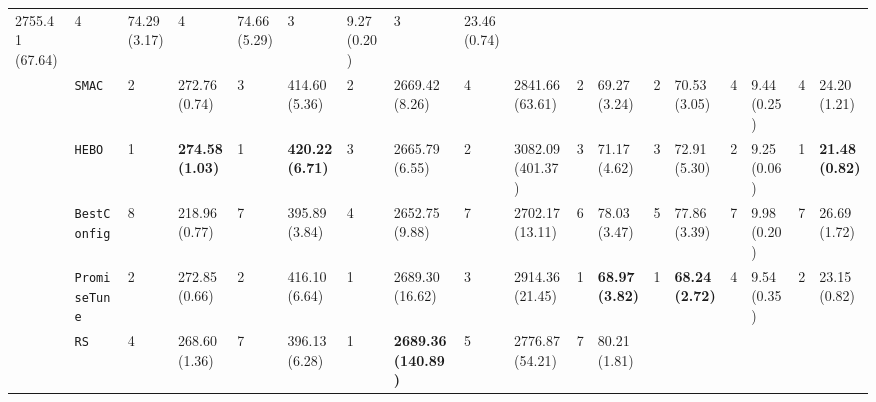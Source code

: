 \begin{tabular}{clllllllllllllllll}
  \multicolumn{1}{l|}{2755.41 (67.64)} &
  4 &
  \multicolumn{1}{l|}{74.29 (3.17)} &
  4 &
  \multicolumn{1}{l|}{74.66 (5.29)} &
  3 &
  \multicolumn{1}{l|}{9.27 (0.20)} &
  3 &
  23.46 (0.74) \\
\multicolumn{1}{c|}{} &
  \multicolumn{1}{l|}{\texttt{SMAC}} &
  2 &
  \multicolumn{1}{l|}{272.76 (0.74)} &
  3 &
  \multicolumn{1}{l|}{414.60 (5.36)} &
  2 &
  \multicolumn{1}{l|}{2669.42 (8.26)} &
  4 &
  \multicolumn{1}{l|}{2841.66 (63.61)} &
  2 &
  \multicolumn{1}{l|}{69.27 (3.24)} &
  2 &
  \multicolumn{1}{l|}{70.53 (3.05)} &
  4 &
  \multicolumn{1}{l|}{9.44 (0.25)} &
  4 &
  24.20 (1.21) \\
\multicolumn{1}{c|}{} &
  \multicolumn{1}{l|}{\texttt{HEBO}} &
  \cellcolor{blue!15}1 &
  \multicolumn{1}{l|}{\cellcolor{blue!15}\textbf{274.58 (1.03)}} &
  \cellcolor{blue!15}1 &
  \multicolumn{1}{l|}{\cellcolor{blue!15}\textbf{420.22 (6.71)}} &
  3 &
  \multicolumn{1}{l|}{2665.79 (6.55)} &
  2 &
  \multicolumn{1}{l|}{3082.09 (401.37)} &
  3 &
  \multicolumn{1}{l|}{71.17 (4.62)} &
  3 &
  \multicolumn{1}{l|}{72.91 (5.30)} &
  2 &
  \multicolumn{1}{l|}{9.25 (0.06)} &
  \cellcolor{blue!15}1 &
  \cellcolor{blue!15}\textbf{21.48 (0.82)} \\
\multicolumn{1}{c|}{} &
  \multicolumn{1}{l|}{\texttt{BestConfig}} &
  8 &
  \multicolumn{1}{l|}{218.96 (0.77)} &
  7 &
  \multicolumn{1}{l|}{395.89 (3.84)} &
  4 &
  \multicolumn{1}{l|}{2652.75 (9.88)} &
  7 &
  \multicolumn{1}{l|}{2702.17 (13.11)} &
  6 &
  \multicolumn{1}{l|}{78.03 (3.47)} &
  5 &
  \multicolumn{1}{l|}{77.86 (3.39)} &
  7 &
  \multicolumn{1}{l|}{9.98 (0.20)} &
  7 &
  26.69 (1.72) \\
\multicolumn{1}{c|}{} &
  \multicolumn{1}{l|}{\texttt{PromiseTune}} &
  2 &
  \multicolumn{1}{l|}{272.85 (0.66)} &
  2 &
  \multicolumn{1}{l|}{416.10 (6.64)} &
  \cellcolor{blue!15}1 &
  \multicolumn{1}{l|}{\cellcolor{blue!15}2689.30 (16.62)} &
  3 &
  \multicolumn{1}{l|}{2914.36 (21.45)} &
  \cellcolor{blue!15}1 &
  \multicolumn{1}{l|}{\cellcolor{blue!15}\textbf{68.97 (3.82)}} &
  \cellcolor{blue!15}1 &
  \multicolumn{1}{l|}{\cellcolor{blue!15}\textbf{68.24 (2.72)}} &
  4 &
  \multicolumn{1}{l|}{9.54 (0.35)} &
  2 &
  23.15 (0.82) \\
\multicolumn{1}{c|}{} &
  \multicolumn{1}{l|}{\texttt{RS}} &
  4 &
  \multicolumn{1}{l|}{268.60 (1.36)} &
  7 &
  \multicolumn{1}{l|}{396.13 (6.28)} &
  \cellcolor{blue!15}1 &
  \multicolumn{1}{l|}{\cellcolor{blue!15}\textbf{2689.36 (140.89)}} &
  5 &
  \multicolumn{1}{l|}{2776.87 (54.21)} &
  7 &
  \multicolumn{1}{l|}{80.21 (1.81)} &

\end{tabular}
